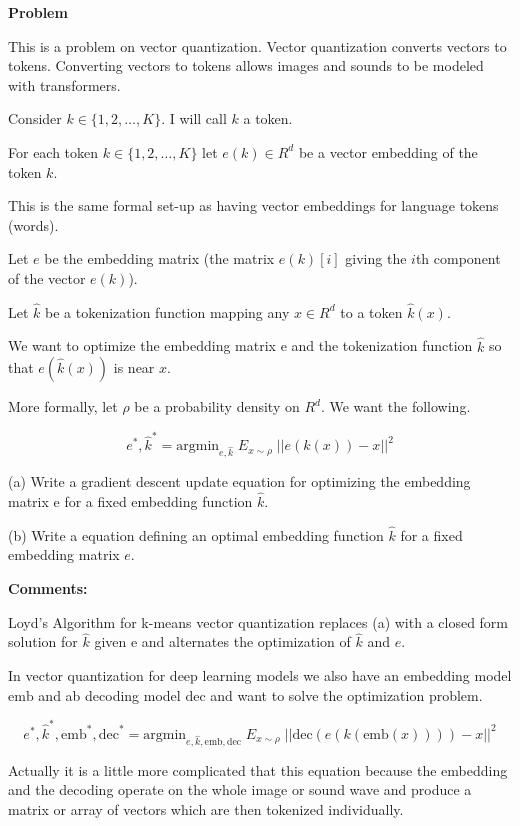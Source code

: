 \documentclass{article}
\begin{document}
\eject

{\bf Problem}

This is a problem on vector quantization.  Vector quantization converts vectors to tokens.
Converting vectors to tokens allows images and sounds to be modeled with transformers.

Consider $k \in \{1,2,\ldots,K\}$.  I will call $k$ a token.

For each token $k \in \{1,2,\ldots,K\}$ let $e(k) \in R^d$ be a vector embedding of the token $k$.

This is the same formal set-up as having vector embeddings for language tokens (words).

Let $e$ be the embedding matrix (the matrix $e(k)[i]$ giving the $i$th component of the vector $e(k)$).

Let $\hat{k}$ be a tokenization function mapping any $x \in R^d$ to a token $\hat{k}(x)$.

We want to optimize the embedding matrix e and the tokenization function $\hat{k}$
so that $e(\hat{k}(x))$ is near $x$.

More formally, let $\rho$ be a probability density on $R^d$.  We want the following.

$$e^*,\hat{k}^* = \mathrm{argmin}_{e,\hat{k}}\;E_{x \sim \rho}\;||e(k(x)) - x||^2$$

(a) Write a gradient descent update equation for optimizing the embedding matrix e for a fixed embedding function $\hat{k}$.

(b) Write a equation defining an optimal embedding function $\hat{k}$ for a fixed embedding matrix $e$.

{\bf Comments:}

Loyd's Algorithm for k-means vector quantization replaces (a) with a closed form solution for $\hat{k}$ given e and alternates the optimization of $\hat{k}$ and $e$.

In vector quantization for deep learning models we also have an embedding model
$\mathrm{emb}$ and ab  decoding model $\mathrm{dec}$ and want to solve the optimization problem.

$$e^*,\hat{k}^*,\mathrm{emb}^*,\mathrm{dec}^*= \mathrm{argmin}_{e,\hat{k},\mathrm{emb},\mathrm{dec}}\;E_{x \sim \rho}\;||\mathrm{dec}(e(k(\mathrm{emb}(x))))- x||^2$$

Actually it is a little more complicated that this equation because the embedding and the decoding operate on the whole image or sound wave and produce a matrix or array of vectors which are then tokenized individually.
\end{document}
